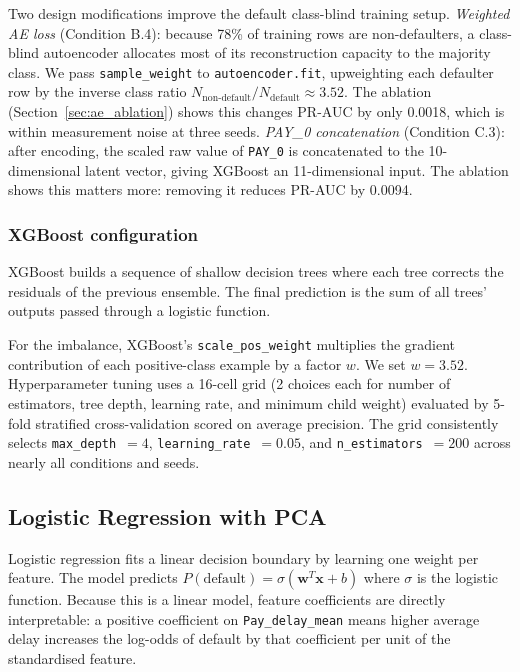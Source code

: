 \documentclass[12pt,a4paper]{article}
\begin{document}
Two design modifications improve the default class-blind training setup.
\emph{Weighted AE loss} (Condition B.4): because 78\% of training rows are
non-defaulters, a class-blind autoencoder allocates most of its reconstruction
capacity to the majority class. We pass \texttt{sample\_weight} to
\texttt{autoencoder.fit}, upweighting each defaulter row by the inverse class
ratio $N_{\text{non-default}}/N_{\text{default}} \approx 3.52$. The ablation
(Section~\ref{sec:ae_ablation}) shows this changes PR-AUC by only 0.0018,
which is within measurement noise at three seeds. \emph{PAY\_0 concatenation}
(Condition C.3): after encoding, the scaled raw value of \texttt{PAY\_0} is
concatenated to the 10-dimensional latent vector, giving XGBoost an
11-dimensional input. The ablation shows this matters more: removing it
reduces PR-AUC by 0.0094.

\subsubsection*{XGBoost configuration}

XGBoost builds a sequence of shallow decision trees where each tree corrects
the residuals of the previous ensemble. The final prediction is the sum of
all trees' outputs passed through a logistic function.

For the imbalance, XGBoost's \texttt{scale\_pos\_weight} multiplies the
gradient contribution of each positive-class example by a factor $w$. We
set $w = 3.52$. Hyperparameter tuning uses a 16-cell grid (2 choices each
for number of estimators, tree depth, learning rate, and minimum child
weight) evaluated by 5-fold stratified cross-validation scored on
average precision. The grid consistently selects \texttt{max\_depth}~$= 4$,
\texttt{learning\_rate}~$= 0.05$, and \texttt{n\_estimators}~$= 200$ across
nearly all conditions and seeds.

\subsection{Logistic Regression with PCA}

Logistic regression fits a linear decision boundary by learning one weight
per feature. The model predicts $P(\text{default}) = \sigma(\mathbf{w}^T
\mathbf{x} + b)$ where $\sigma$ is the logistic function. Because this
is a linear model, feature coefficients are directly interpretable: a
positive coefficient on \texttt{Pay\_delay\_mean} means higher average
delay increases the log-odds of default by that coefficient per unit of
the standardised feature.
\end{document}

